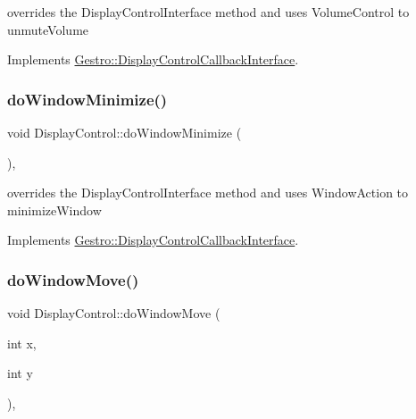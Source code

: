 overrides the Display\+Control\+Interface method and uses Volume\+Control to unmute\+Volume 

Implements \hyperlink{classGestro_1_1DisplayControlCallbackInterface_a74ddca7b1ef399a41f6025163407bb4d}{Gestro\+::\+Display\+Control\+Callback\+Interface}.

\mbox{\label{classGestro_1_1DisplayControl_ad5fa763a77c680ce7b2089c6d79c4eb7}} 
\subsubsection{\texorpdfstring{do\+Window\+Minimize()}{doWindowMinimize()}}
{\footnotesize\ttfamily void Display\+Control\+::do\+Window\+Minimize (\begin{DoxyParamCaption}{ }\end{DoxyParamCaption})\hspace{0.3cm}{\ttfamily [override]}, {\ttfamily [virtual]}}

overrides the Display\+Control\+Interface method and uses Window\+Action to minimize\+Window 

Implements \hyperlink{classGestro_1_1DisplayControlCallbackInterface_a677aa306f08c548396a048c680bf5e10}{Gestro\+::\+Display\+Control\+Callback\+Interface}.

\mbox{\label{classGestro_1_1DisplayControl_aca4208c53cac28e164e7949effdc04cd}} 
\subsubsection{\texorpdfstring{do\+Window\+Move()}{doWindowMove()}}
{\footnotesize\ttfamily void Display\+Control\+::do\+Window\+Move (\begin{DoxyParamCaption}\item[{int}]{x,  }\item[{int}]{y }\end{DoxyParamCaption})\hspace{0.3cm}{\ttfamily [override]}, {\ttfamily [virtual]}}

